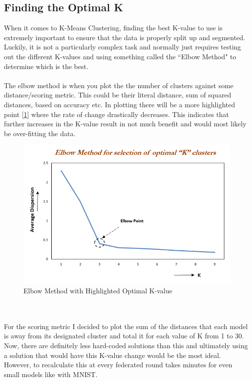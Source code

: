 \subsection{Finding the Optimal K}
When it comes to K-Means Clustering, finding the best K-value to use is extremely important to ensure that the data is properly split up and segmented.
Luckily, it is not a particularly complex task and normally just requires testing out the different K-values and using something called the ``Elbow Method" to determine which is the best.
\\ \\
The elbow method is when you plot the the number of clusters against some distance/scoring metric.
This could be their literal distance, sum of squared distances, based on accuracy etc.
In plotting there will be a more highlighted point [\ref{fig:elbow}] where the rate of change drastically decreases.
This indicates that further increases in the K-value result in not much benefit and would most likely be over-fitting the data.
\begin{figure}[htbp]
	\centering
    \includegraphics[scale=0.5]{my_agg/graphs/elbow.png}
	\caption{Elbow Method with Highlighted Optimal K-value \cite{oreily_elbow}}
	\label{fig:elbow}
\end{figure}
\\ \\
For the scoring metric I decided to plot the sum of the distances that each model is away from its designated cluster and total it for each value of K from 1 to 30.
Now, there are definitely less hard-coded solutions than this and ultimately using a solution that would have this K-value change would be the most ideal.
However, to recalculate this at every federated round takes minutes for even small models like with MNIST.
